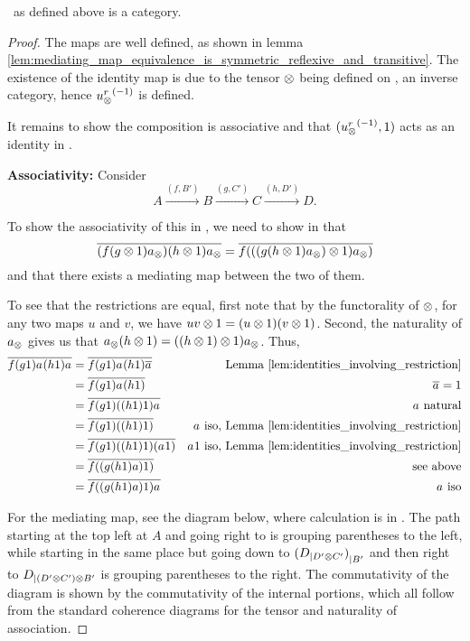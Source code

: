 \begin{lemma}\label{lem:xt_is_a_category}
  \Xt\ as defined above is a category.
\end{lemma}
\begin{proof}
  The maps are well defined, as shown in lemma
  \vref{lem:mediating_map_equivalence_is_symmetric_reflexive_and_transitive}. The existence of the
  identity map is due to the tensor $\otimes$ being defined on \X, an inverse category, hence
  ${u_{\otimes}^r}^{(-1)}$ is defined.

  It remains to show the composition is associative and that $({u_{\otimes}^r}^{(-1)}, 1)$ acts as an identity
  in \Xt.

  \textbf{Associativity:}
  Consider
  \[
    A\xrightarrow{(f,B')}B\xrightarrow{(g,C')} C \xrightarrow{(h,D')}D.
  \]

  To show the associativity of this in \Xt, we need to show in \X that
  \[
    \overline{(f(g\otimes1)a_{\otimes}) (h\otimes1)a_{\otimes}} = \overline{f (((g(h\otimes1)a_{\otimes})\otimes1) a_{\otimes})}
  \]
  and that there exists a mediating map between the two of them.

  To see that the restrictions are equal, first note that by the functorality of $\otimes$, for any two
  maps $u$ and $v$, we have $u v \otimes 1 = (u\otimes1) (v\otimes1)$. Second, the naturality of $a_{\otimes}$ gives us
  that $a_{\otimes} (h \otimes 1) = ((h\otimes1)\otimes1) a_{\otimes}$. Thus,
  \begin{align*}
    \restr{f(g\*1)a_{\*} (h\*1)a_{\*}}
      & = \restr{f(g\*1)a_{\*} (h\*1)\restr{a_{\*}}}
    & \text{Lemma \ref{lem:identities_involving_restriction}} \\
    & = \restr{f(g\*1)a_{\*} (h\*1)} & \restr{a_{\*}}=1 \\
    & = \restr{f(g\*1) ((h\*1)\*1) a_{\*} } & a_{\*}\text{ natural} \\
    & = \restr{f(g\*1) ((h\*1)\*1) }
      & a_{\*}   \text{ iso, Lemma \ref{lem:identities_involving_restriction}}\\
    & = \restr{f(g\*1) ((h\*1)\*1) (a_{\*}\*1)}
      & a_{\*}\*1 \text{ iso, Lemma \ref{lem:identities_involving_restriction}}\\
    & = \restr{f((g (h\*1)a )\*1)} & \text{ see above}\\
    & = \restr{f((g (h\*1)a )\*1)a_{\*}} & a_{\*}   \text{ iso}
  \end{align*}

  For the mediating map, see the diagram below, where calculation is in \X. The path starting at
  the top left at $A$ and going right to  is grouping parentheses to the
  left, while starting in the same place but going down to ${({D}_{|{D' \otimes C'}})}_{|{B'}}$ and
  then right to $ {D}_{|{(D' \otimes C') \otimes B'}}$ is grouping parentheses to the right. The
  commutativity of the diagram is shown by the commutativity of the internal portions, which all
  follow from the standard coherence diagrams for the tensor and naturality of association.


\end{proof}
